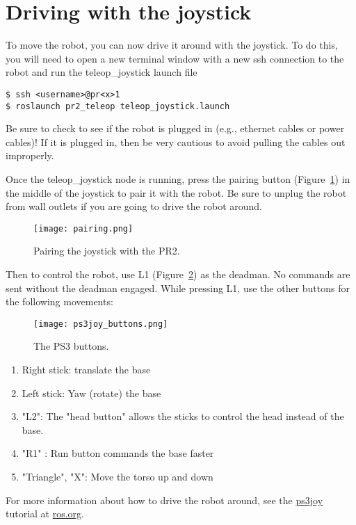 \section{Driving with the joystick}
To move the robot, you can now drive it around with the joystick.  To do this, you will need to open a new terminal window with a new ssh connection 
to the robot and run the teleop\_joystick launch file
\begin{verbatim}
$ ssh <username>@pr<x>1
$ roslaunch pr2_teleop teleop_joystick.launch 
\end{verbatim}

Be sure to check to see if the robot is plugged in (e.g., ethernet cables or power cables)! If it is plugged in, then be very cautious to avoid pulling the cables out improperly.

Once the teleop\_joystick node is running, press the pairing button (Figure~\ref{fig:ps3_pairing}) in the middle of the 
joystick to pair it with the robot. Be sure to unplug the robot from wall outlets if you are going to drive the robot around. 
\begin{figure}[H]
\centering
\texttt{[image: pairing.png]}
\caption{Pairing the joystick with the PR2.}
\label{fig:ps3_pairing}
\end{figure}
Then to control the robot, use L1 (Figure~\ref{fig:buttons}) as the deadman.
No commands are sent without the deadman engaged.
While pressing L1, use the other buttons for the following movements:
\begin{figure}[H]
\centering
\texttt{[image: ps3joy\_buttons.png]}
\caption{The PS3 buttons.}
\label{fig:buttons}
\end{figure}
\begin{enumerate}
\item Right stick: translate the base
\item Left stick: Yaw (rotate) the base
\item "L2": The "head button" allows the sticks to control the head instead of the base.
\item "R1" : Run button commands the base faster
\item "Triangle", "X": Move the torso up and down 
\end{enumerate}

For more information about how to drive the robot around, see the 
\href{http://www.ros.org/wiki/ps3joy/Tutorials/UsingJoystickWithPR2}{ps3joy} tutorial at \href{http://www.ros.org}{ros.org}. 

